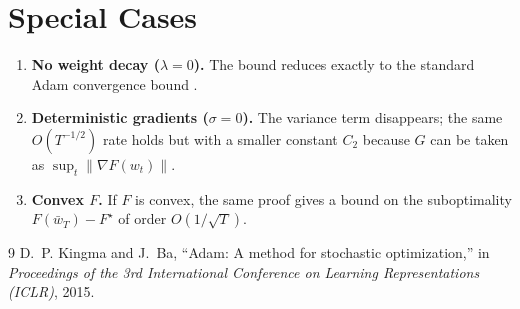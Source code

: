 \documentclass{article}
\newcommand{\norm}[1]{\left\lVert #1 \right\rVert}
\begin{document}
\section{Special Cases}
\label{sec:special}
\begin{enumerate}[label=(\alph*)]
    \item \textbf{No weight decay ($\lambda=0$).} The bound reduces exactly to the standard Adam convergence bound \cite{kingma2015adam}.
    \item \textbf{Deterministic gradients ($\sigma=0$).} The variance term disappears; the same $O(T^{-1/2})$ rate holds but with a smaller constant $C_2$ because $G$ can be taken as $\sup_t\norm{\nabla F(w_t)}$.
    \item \textbf{Convex $F$.} If $F$ is convex, the same proof gives a bound on the suboptimality $F(\bar w_T)-F^\star$ of order $O(1/\sqrt{T})$.
\end{enumerate}

\begin{thebibliography}{9}
D.~P. Kingma and J.~Ba, ``Adam: A method for stochastic optimization,'' in \emph{Proceedings of the 3rd International Conference on Learning Representations (ICLR)}, 2015.
\end{thebibliography}
\end{document}
